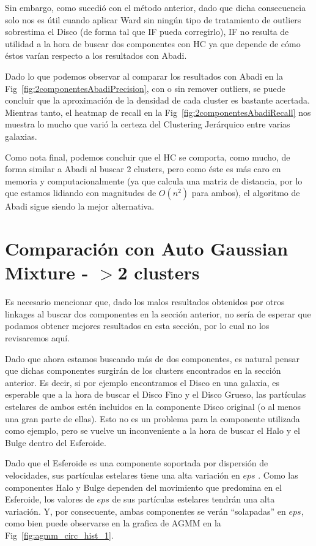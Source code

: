 Sin embargo, como sucedió con el método anterior, dado que dicha consecuencia solo nos es útil cuando aplicar Ward sin ningún tipo de tratamiento de outliers sobrestima el Disco (de forma tal que \gls{IF} pueda corregirlo), \gls{IF} no resulta de utilidad a la hora de buscar dos componentes con \gls{HC} ya que depende de cómo éstos varían respecto a los resultados con Abadi.

Dado lo que podemos observar al comparar los resultados con Abadi en la Fig~\ref{fig:2componentesAbadiPrecision}, con o sin remover outliers, se puede concluir que la aproximación de la densidad de cada cluster es bastante acertada. Mientras tanto, el heatmap de recall en la Fig~\ref{fig:2componentesAbadiRecall} nos muestra lo mucho que varió la certeza del Clustering Jerárquico entre varias galaxias.

Como nota final, podemos concluir que el \gls{HC} se comporta, como mucho, de forma similar a Abadi al buscar 2 clusters, pero como éste es más caro en memoria y computacionalmente (ya que calcula una matriz de distancia, por lo que estamos lidiando con magnitudes de $O(n^2)$ para ambos), el algoritmo de Abadi sigue siendo la mejor alternativa.

\section{Comparación con Auto Gaussian Mixture - $>$2 clusters}

Es necesario mencionar que, dado los malos resultados obtenidos por otros linkages al buscar dos componentes en la sección anterior, no sería de esperar que podamos obtener mejores resultados en esta sección, por lo cual no los revisaremos aquí.

Dado que ahora estamos buscando más de dos componentes, es natural pensar que dichas componentes surgirán de los clusters encontrados en la sección anterior. Es decir, si por ejemplo encontramos el Disco en una galaxia, es esperable que a la hora de buscar el Disco Fino y el Disco Grueso, las partículas estelares de ambos estén incluidos en la componente Disco original (o al menos una gran parte de ellas). Esto no es un problema para la componente utilizada como ejemplo, pero se vuelve un inconveniente a la hora de buscar el Halo y el Bulge dentro del Esferoide.

Dado que el Esferoide es una componente soportada por dispersión de velocidades, sus partículas estelares tiene una alta variación en $eps$ \citep{mo2010galaxy}. Como las componentes Halo y Bulge dependen del movimiento que predomina en el Esferoide, los valores de $eps$ de sus partículas estelares tendrán una alta variación. Y, por consecuente, ambas componentes se verán ``solapadas'' en $eps$, como bien puede observarse en la grafica de \gls{AGMM} en la Fig~\ref{fig:agmm_circ_hist_1}.

